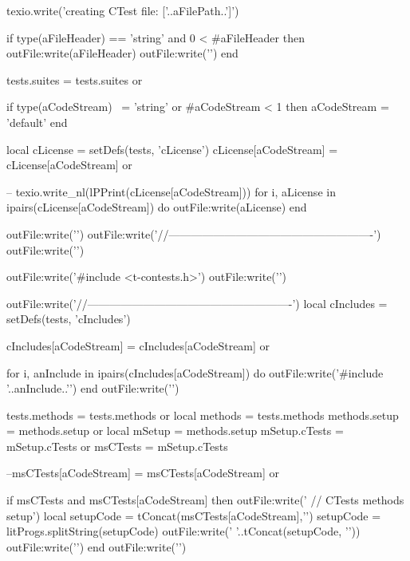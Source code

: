   texio.write('creating CTest file: ['..aFilePath..']\n')

  if type(aFileHeader) == 'string'
    and 0 < #aFileHeader then
    outFile:write(aFileHeader)
    outFile:write('\n\n')
  end

  tests.suites = tests.suites or { }

  if type(aCodeStream) ~= 'string'
    or #aCodeStream < 1 then
    aCodeStream = 'default'
  end

  local cLicense = setDefs(tests, 'cLicense')
  cLicense[aCodeStream] = cLicense[aCodeStream] or { }

--  texio.write_nl(lPPrint(cLicense[aCodeStream]))
  for i, aLicense in ipairs(cLicense[aCodeStream]) do
    outFile:write(aLicense)
  end

  outFile:write('\n\n')
  outFile:write('//-------------------------------------------------------\n')
  outFile:write('\n\n')

  outFile:write('#include <t-contests.h>\n')
  outFile:write('\n\n')

  outFile:write('//-------------------------------------------------------\n')
  local cIncludes = setDefs(tests, 'cIncludes')

  cIncludes[aCodeStream] = cIncludes[aCodeStream] or { }

  for i, anInclude in ipairs(cIncludes[aCodeStream]) do
    outFile:write('#include '..anInclude..'\n')
  end
  outFile:write('\n\n')

  tests.methods = tests.methods or { }
  local methods = tests.methods
  methods.setup = methods.setup or { }
  local mSetup  = methods.setup
  mSetup.cTests = mSetup.cTests or { }
  msCTests      = mSetup.cTests

  --msCTests[aCodeStream] = msCTests[aCodeStream] or { }

  if msCTests and
    msCTests[aCodeStream] then
    outFile:write('  // CTests methods setup\n')
    local setupCode = tConcat(msCTests[aCodeStream],'\n')
    setupCode       = litProgs.splitString(setupCode)
    outFile:write('  '..tConcat(setupCode, '\n  '))
    outFile:write('\n\n')
  end
  outFile:write('\n\n')

